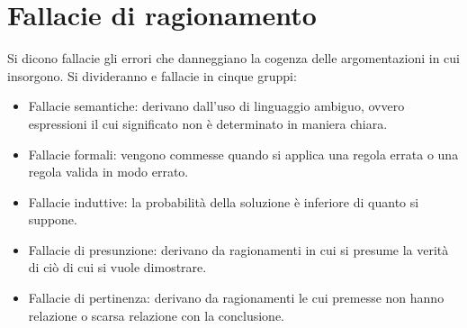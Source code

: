 \section{Fallacie di ragionamento}
Si dicono fallacie gli errori che danneggiano la cogenza delle argomentazioni in cui insorgono. Si divideranno e fallacie in cinque gruppi:
\begin{itemize}
\item Fallacie semantiche: derivano dall'uso di linguaggio ambiguo, ovvero espressioni il cui significato non \`e determinato in maniera chiara.
\item Fallacie formali: vengono commesse quando si applica una regola errata o una regola valida in modo errato.
\item Fallacie induttive: la probabilit\`a della soluzione \`e inferiore di quanto si suppone.
\item Fallacie di presunzione: derivano da ragionamenti in cui si presume la verit\`a di ci\`o di cui si vuole dimostrare.
\item Fallacie di pertinenza: derivano da ragionamenti le cui premesse non hanno relazione o scarsa relazione con la conclusione.
\end{itemize}